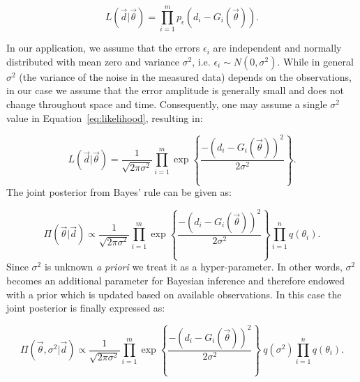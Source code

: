 \begin{equation} 
L(\vec d |  \vec{\theta}) 
= 
\prod_{i=1}^m  
p_\epsilon (d_i - G_i(\vec \theta)).  	
\label{eq:likelihood}
\end{equation}

In our application, we assume that the errors $\epsilon_i$ are independent
and normally distributed with mean
zero and variance $\sigma^2$, i.e. $\epsilon_i \sim N(0,\sigma^2)$. 
While in general $\sigma^2$ (the variance of the noise in the measured data) depends on the observations, in our case we assume that the error
amplitude is generally small and does not change throughout space and time.
Consequently, one may assume a single $\sigma^2$ value in Equation~\eqref{eq:likelihood},
resulting in:

\begin{equation} 
L(\vec d |  \vec{\theta}) 
= 
\frac{1}{\sqrt{2 \pi \sigma^2}}\prod_{i=1}^m   
\exp \left\lbrace \frac{-(d_i - G_i(\vec \theta))^2}{2 \sigma^2} \right\rbrace. 	
\label{eq:likelihood2}
\end{equation}
The joint posterior from Bayes' rule can be given as:

\begin{equation} 
\Pi(\vec{\theta}| \vec d)
\propto
\frac{1}{\sqrt{2 \pi \sigma^2}}   \prod_{i=1}^m  
\exp \left\lbrace \frac{-(d_i - G_i(\vec \theta))^2}{2 \sigma^2} \right\rbrace  
\prod_{i=1}^n q(\theta_i).
\end{equation}
Since $\sigma^2$ is unknown \emph{a priori} we treat it as a hyper-parameter.
In other words, $\sigma^2$ becomes an additional parameter for Bayesian inference and  
therefore endowed with a prior which is updated based on available observations. In this 
case the joint posterior is finally expressed as:

\begin{equation} 
\Pi(\vec{\theta},\sigma^2 | \vec d)
\propto
\frac{1}{\sqrt{2 \pi \sigma^2}}   \prod_{i=1}^m  
\exp \left\lbrace \frac{-(d_i - G_i(\vec \theta))^2}{2 \sigma^2} \right\rbrace
\ q(\sigma^2) \prod_{i=1}^n q(\theta_i).
\label{eq:post}
\end{equation}


